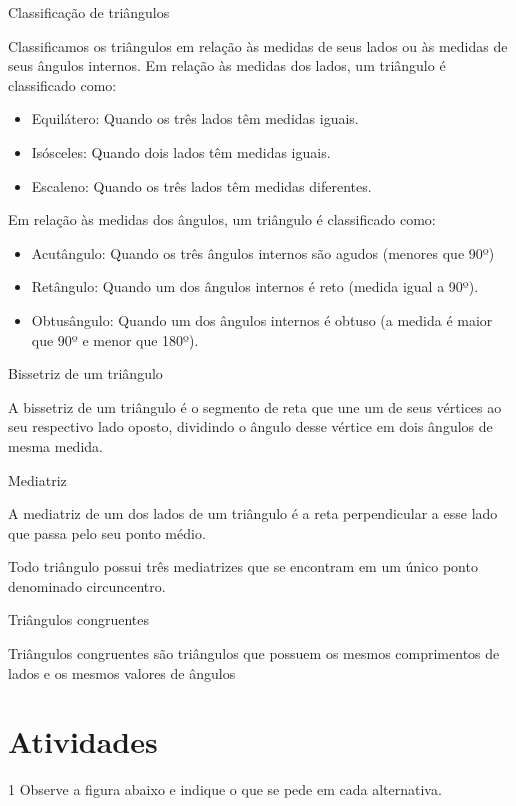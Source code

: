 Classificação de triângulos

Classificamos os triângulos em relação às medidas de seus lados ou às
medidas de seus ângulos internos. Em relação às medidas dos lados, um
triângulo é classificado como:

\begin{itemize}
\item
  Equilátero: Quando os três lados têm medidas iguais.
\item
  Isósceles: Quando dois lados têm medidas iguais.
\item
  Escaleno: Quando os três lados têm medidas diferentes.
\end{itemize}

Em relação às medidas dos ângulos, um triângulo é classificado como:

\begin{itemize}
\item
  Acutângulo: Quando os três ângulos internos são agudos (menores que
  90º)
\item
  Retângulo: Quando um dos ângulos internos é reto (medida igual a 90º).
\item
  Obtusângulo: Quando um dos ângulos internos é obtuso (a medida é maior
  que 90º e menor que 180º).
\end{itemize}

Bissetriz de um triângulo

A bissetriz de um triângulo é o segmento de reta que une um de seus
vértices ao seu respectivo lado oposto, dividindo o ângulo desse vértice
em dois ângulos de mesma medida.

Mediatriz

A mediatriz de um dos lados de um triângulo é a reta perpendicular a
esse lado que passa pelo seu ponto médio.

Todo triângulo possui três mediatrizes que se encontram em um único
ponto denominado circuncentro.

Triângulos congruentes

Triângulos congruentes são triângulos que possuem os mesmos comprimentos
de lados e os mesmos valores de ângulos

\section{Atividades}

\num{1} Observe a figura abaixo e indique o que se pede em cada alternativa.

